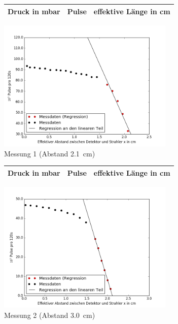 \clearpage

 \begin{figure}[h!]
 	\centering
 	\begin{tabular}{c|c|c}
 		Druck in \si{\milli\bar} & Pulse & effektive Länge in \si{cm} \\
 		\hline
 		
 	\end{tabular}
 	\label{tab:messung1}
 \end{figure}

\begin{figure}[h!]
	\centering
	\includegraphics[width=0.75\textwidth]{build/pulse1.png}
	\caption{Messung 1 (Abstand \SI{2,1}{\centi\meter})}
	\label{fig:pulse1}
\end{figure}

\clearpage

 \begin{figure}[h!]
 	\centering
 	\begin{tabular}{c|c|c}
 		Druck in \si{\milli\bar} & Pulse & effektive Länge in \si{cm} \\
 		\hline
 		
 	\end{tabular}
 	\label{tab:messung2}
 \end{figure}
 
 \begin{figure}[h!]
 	\centering
 	\includegraphics[width=0.75\textwidth]{build/pulse2.png}
 	\caption{Messung 2 (Abstand \SI{3,0}{\centi\meter})}
 	\label{fig:pulse2}
 \end{figure}
 

